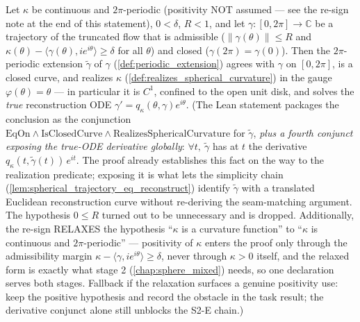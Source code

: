 \begin{lemma}
  \label{lem:reconstruction_ode}
  Let $\kappa$ be continuous and $2\pi$-periodic (positivity NOT assumed — see the
  re-sign note at the end of this statement), $0<\delta$, $R<1$, and let
  $\gamma:[0,2\pi]\to\mathbb C$ be a trajectory of the truncated flow that is admissible
  ($\|\gamma(\theta)\|\le R$ and $\kappa(\theta)-\langle \gamma(\theta),ie^{i\theta}\rangle\ge\delta$
  for all $\theta$) and closed ($\gamma(2\pi)=\gamma(0)$). Then the $2\pi$-periodic extension
  $\tilde\gamma$ of $\gamma$ (\cref{def:periodic_extension}) agrees with $\gamma$ on $[0,2\pi]$, is a
  closed curve, and realizes $\kappa$ (\cref{def:realizes_spherical_curvature}) in the
  gauge $\varphi(\theta)=\theta$ — in particular it is $C^1$, confined to the open unit
  disk, and solves the \emph{true} reconstruction ODE $\gamma'=q_\kappa(\theta,\gamma)e^{i\theta}$.
  (The Lean statement packages the conclusion as the conjunction
  $\mathrm{EqOn}\wedge\mathrm{IsClosedCurve}\wedge\mathrm{RealizesSphericalCurvature}$
  for $\tilde\gamma$, \emph{plus a fourth conjunct exposing the true-ODE derivative
  globally}: $\forall t,\ \tilde\gamma$ has at $t$ the derivative
  $q_\kappa(t,\tilde\gamma(t))\,e^{it}$. The proof already establishes this fact on the way
  to the realization predicate; exposing it is what lets the simplicity chain
  (\cref{lem:spherical_trajectory_eq_reconstruct}) identify $\tilde\gamma$ with a translated
  Euclidean reconstruction curve without re-deriving the seam-matching argument. The
  hypothesis $0\le R$ turned out to be unnecessary and is dropped. Additionally, the
  re-sign RELAXES the hypothesis ``$\kappa$ is a curvature function'' to ``$\kappa$ is
  continuous and $2\pi$-periodic'' — positivity of $\kappa$ enters the proof only
  through the admissibility margin $\kappa-\langle \gamma,ie^{i\theta}\rangle\ge\delta$,
  never through $\kappa>0$ itself, and the relaxed form is exactly what stage 2
  (\cref{chap:sphere_mixed}) needs, so one declaration serves both stages. Fallback if
  the relaxation surfaces a genuine positivity use: keep the positive hypothesis and
  record the obstacle in the task result; the derivative conjunct alone still unblocks
  the S2-E chain.)
\end{lemma}

